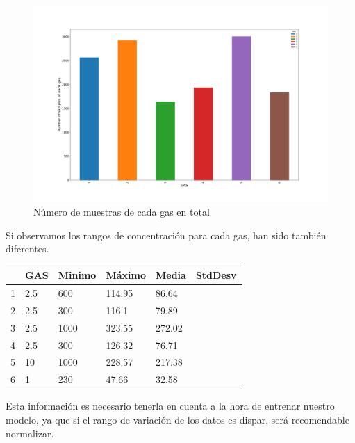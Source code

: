 \begin{figure}[ht!]
	\centering
	\includegraphics[width=\columnwidth]{../py_imgs/Step0_Count_Gas.png}
	\caption{Número de muestras de cada gas en total}
	\label{fig: gasCount}
\end{figure}

Si observamos los rangos de concentración para cada gas, han sido también diferentes.

\begin{table}
    \centering
    \begin{tabular}{|l|l|l|l|l|l|}
    \hline
          & GAS & Minimo & Máximo & Media  & StdDesv \\ \hline
        1 & 2.5 & 600    & 114.95 & 86.64  &         \\ \hline
        2 & 2.5 & 300    & 116.1  & 79.89  &         \\ \hline
        3 & 2.5 & 1000   & 323.55 & 272.02 &         \\ \hline
        4 & 2.5 & 300    & 126.32 & 76.71  &         \\ \hline
        5 & 10  & 1000   & 228.57 & 217.38 &         \\ \hline
        6 & 1   & 230    & 47.66  & 32.58  &         \\ \hline
    \end{tabular}
\end{table}

Esta información es necesario tenerla en cuenta a la hora de entrenar nuestro modelo, ya que
si el rango de variación de los datos es dispar, será recomendable normalizar.





